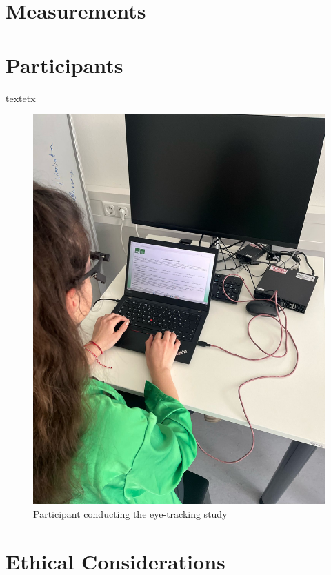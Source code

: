 \section{Measurements}

\section{Participants}

textetx

\begin{figure} [H]
  \centering
  \includegraphics[scale=0.2]{figures/user.jpg}
  \caption{Participant conducting the eye-tracking study }
  \label{fig:AnhangsChor}
\end{figure}





\section{Ethical Considerations}

